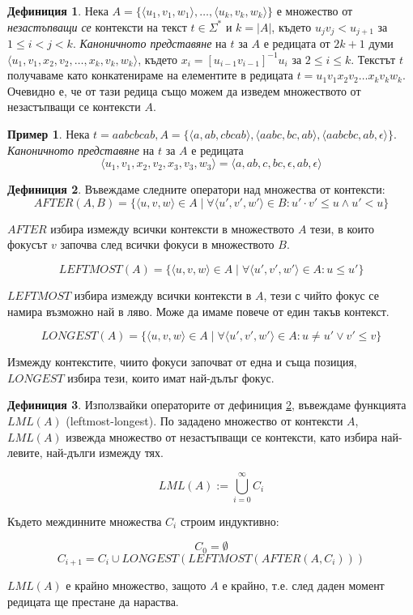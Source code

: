 \documentclass[12pt, oneside]{article}
\theoremstyle{definition}
\newtheorem{definition}{Дефиниция}[section]
\newtheorem{example}{Пример}[section]
\begin{document}
\begin{definition}
	Нека \(A = \{ \langle u_1, v_1, w_1 \rangle, \dots , \langle u_k, v_k, w_k \rangle \}\) е множество от \emph{незастъпващи се} контексти на текст \(t \in \Sigma^*\) и \(k = |A|\), където \( u_jv_j < u_{j+1} \) за \( 1 \le i < j < k \). \emph{Каноничното представяне} на \(t\) за \(A\) е редицата от \(2k+1\) думи \( \langle u_1, v_1, x_2, v_2, \dots , x_k, v_k, w_k \rangle \), където \( x_i = [u_{i-1}v_{i-1}]^{-1}u_i \) за \( 2 \le i \le k \). Текстът \(t\) получаваме като конкатенираме на елементите в редицата \(t = u_1v_1x_2v_2 \dots x_kv_kw_k \). Очевидно е, че от тази редица също можем да изведем множеството от незастъпващи се контексти \(A\).
\end{definition}

\begin{example}
	Нека \( t = aabcbcab, A = \{ \langle a, ab, cbcab \rangle, \langle aabc, bc, ab \rangle, \langle aabcbc, ab, \epsilon \rangle \} \). \emph{Каноничното представяне} на \(t\) за \(A\) е редицата
	\[ \langle u_1, v_1, x_2, v_2, x_3, v_3, w_3 \rangle = \langle a, ab, c, bc, \epsilon, ab, \epsilon \rangle \]
\end{example}

\begin{definition}\label{def:LmlOps}
	Въвеждаме следните оператори над множества от контексти:
\[ AFTER(A, B) = \{ \langle u, v, w \rangle \in A \mid \forall \langle u', v', w' \rangle \in B : u' \cdot v' \leq u \land u' < u  \} \] 

\( AFTER \) избира измежду всички контексти в множеството \(A\) тези, в които фокусът \(v\) започва след всички фокуси в множеството \(B\).

\[ LEFTMOST(A) = \{ \langle u, v, w \rangle \in A \mid \forall \langle u', v', w' \rangle \in A : u \leq u' \} \]

\( LEFTMOST \) избира измежду всички контексти в \(A\), тези с чийто фокус се намира възможно най в ляво. Може да имаме повече от един такъв контекст.

\[ LONGEST(A) = \{ \langle u, v, w \rangle \in A \mid \forall \langle u', v', w' \rangle \in A : u \neq u' \lor v' \leq v \} \]

Измежду контекстите, чиито фокуси започват от една и съща позиция, \( LONGEST \) избира тези, които имат най-дълъг фокус.
\end{definition}

\begin{definition}
	Използвайки операторите от дефиниция \ref{def:LmlOps}, въвеждаме функцията \( LML(A) \) (leftmost-longest). По зададено множество от контексти \(A\), \( LML(A) \) извежда множество от незастъпващи се контексти, като избира най-левите, най-дълги измежду тях.

	\[ LML(A) := \bigcup\limits_{i=0}^{\infty} C_{i} \]

	Където междинните множества \( C_i \) строим индуктивно:

	\[ C_0 = \emptyset \]
	\[ C_{i+1} = C_i \cup LONGEST(LEFTMOST(AFTER(A, C_i))) \]

	\noindent \( LML(A) \) е крайно множество, защото \( A \) е крайно, т.е. след даден момент редицата ще престане да нараства.
\end{definition}
\end{document}
